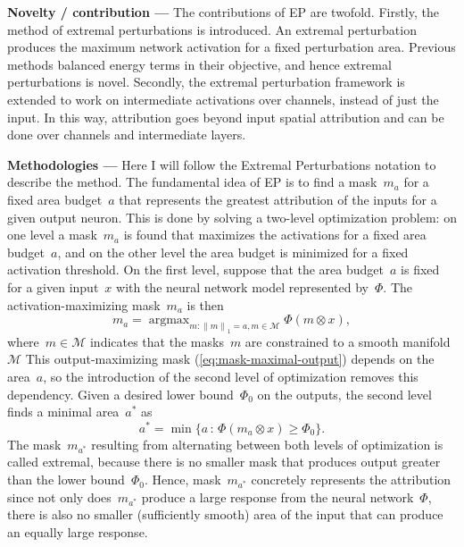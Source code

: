 \documentclass{article}
\DeclareMathOperator*{\argmax}{argmax}
\newcommand{\myparagraph}[1]{\noindent\textbf{#1 ---}}
\begin{document}
\myparagraph{Novelty / contribution} The contributions of EP are twofold.
Firstly, the method of extremal perturbations is introduced.
An extremal perturbation produces the maximum network activation for a fixed perturbation area.
Previous methods balanced energy terms in their objective, and hence extremal perturbations is novel.
Secondly, the extremal perturbation framework is extended to work on intermediate activations over channels, instead of just the input.
In this way, attribution goes beyond input spatial attribution and can be done over channels and intermediate layers.


\myparagraph{Methodologies} Here I will follow the Extremal Perturbations notation to describe the method.
The fundamental idea of EP is to find a mask~$m_a$ for a fixed area budget~$a$ that represents the greatest attribution of the inputs for a given output neuron.
This is done by solving a two-level optimization problem: on one level a mask~$m_a$ is found that maximizes the activations for a fixed area budget~$a$, and on the other level the area budget is minimized for a fixed activation threshold.
On the first level, suppose that the area budget~$a$ is fixed for a given input~$x$ with the neural network model represented by~$\Phi$.
The activation-maximizing mask~$m_a$ is then
\begin{equation}
	m_a = \argmax_{m: {\lVert m\rVert}_1 = a, m \in \mathcal{M}} \Phi(m\otimes x),
	\label{eq:mask-maximal-output}
\end{equation}
where~$m\in\mathcal{M}$ indicates that the masks~$m$ are constrained to a smooth manifold~$\mathcal{M}$
This output-maximizing mask (\ref{eq:mask-maximal-output}) depends on the area~$a$, so the introduction of the second level of optimization removes this dependency.
Given a desired lower bound~$\Phi_0$ on the outputs, the second level finds a minimal area~$a^*$ as
\begin{equation}
	a^* = \min\{a\,:\,\Phi(m_a\otimes x)\geq\Phi_0\}.
	\label{eq:area-minimal}
\end{equation}
The mask~$m_{a^*}$ resulting from alternating between both levels of optimization is called extremal, because there is no smaller mask that produces output greater than the lower bound~$\Phi_0$.
Hence, mask~$m_{a^*}$ concretely represents the attribution since not only does~$m_{a^*}$ produce a large response from the neural network~$\Phi$, there is also no smaller (sufficiently smooth) area of the input that can produce an equally large response.
\end{document}
